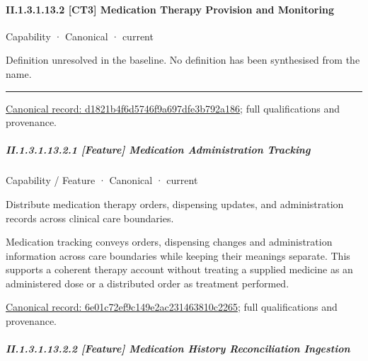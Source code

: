\paragraph*{II.1.3.1.13.2 [CT3] Medication Therapy Provision and Monitoring}
\label{navigation:II.1.3.1.13.2}

\label{element:d1821b4f6d5746f9a697dfe3b792a186}
{\small Capability · Canonical · current}\par

Definition unresolved in the baseline. No definition has been synthesised from the name.



\medskip\hrule\medskip

{\footnotesize \href{../../../../continuum/strategy/capability/d1821b4f6d5746f9a697dfe3b792a186.md}{Canonical record: d1821b4f6d5746f9a697dfe3b792a186}; full qualifications and provenance.}\par
\subparagraph*{II.1.3.1.13.2.1 [Feature] Medication Administration Tracking}
\label{navigation:II.1.3.1.13.2.1}

\label{element:6e01c72ef9c149e2ac231463810c2265}
{\small Capability / Feature · Canonical · current}\par

Distribute medication therapy orders, dispensing updates, and administration records across clinical care boundaries.



Medication tracking conveys orders, dispensing changes and administration information across care boundaries while keeping their meanings separate. This supports a coherent therapy account without treating a supplied medicine as an administered dose or a distributed order as treatment performed.


{\footnotesize \href{../../../../continuum/strategy/capability/feature/6e01c72ef9c149e2ac231463810c2265.md}{Canonical record: 6e01c72ef9c149e2ac231463810c2265}; full qualifications and provenance.}\par
\subparagraph*{II.1.3.1.13.2.2 [Feature] Medication History Reconciliation Ingestion}
\label{navigation:II.1.3.1.13.2.2}

